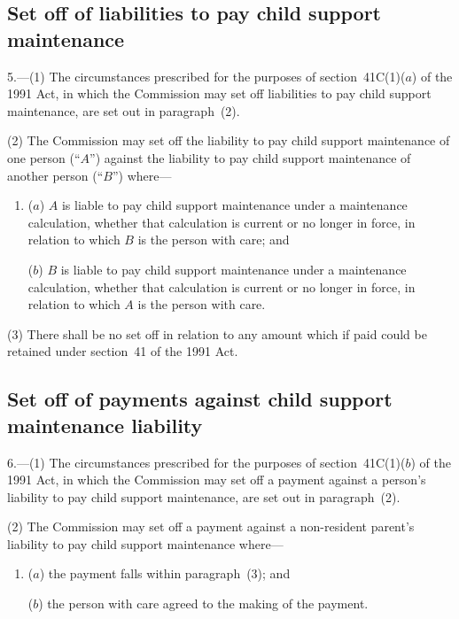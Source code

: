 \documentclass[12pt,a4paper]{article}
\begin{document}
\renewcommand\parthead{--- Part II}

\subsection[5. Set off of liabilities to pay child support maintenance]{Set off of liabilities to pay child support maintenance}

5.---(1)  The circumstances prescribed for the purposes of section~41C(1)($a$)  of the 1991 Act, in which the Commission may set off liabilities to pay child support maintenance, are set out in paragraph~(2).

(2) The Commission may set off the liability to pay child support maintenance of one person (“$A$”) against the liability to pay child support maintenance of another person (“$B$”) where—
\begin{enumerate}\item[]
($a$) $A$ is liable to pay child support maintenance under a maintenance calculation, whether that calculation is current or no longer in force, in relation to which $B$ is the person with care; and

($b$) $B$ is liable to pay child support maintenance under a maintenance calculation, whether that calculation is current or no longer in force, in relation to which $A$ is the person with care.
\end{enumerate}

(3) There shall be no set off in relation to any amount which if paid could be retained under section~41 of the 1991 Act.

\subsection[6. Set off of payments against child support maintenance liability]{Set off of payments against child support maintenance liability}

6.---(1)  The circumstances prescribed for the purposes of section~41C(1)($b$)  of the 1991 Act, in which the Commission may set off a payment against a person’s liability to pay child support maintenance, are set out in paragraph~(2).

(2) The Commission may set off a payment against a non-resident parent’s liability to pay child support maintenance where—
\begin{enumerate}\item[]
($a$) the payment falls within paragraph~(3); and

($b$) the person with care agreed to the making of the payment.
\end{enumerate}
\end{document}
